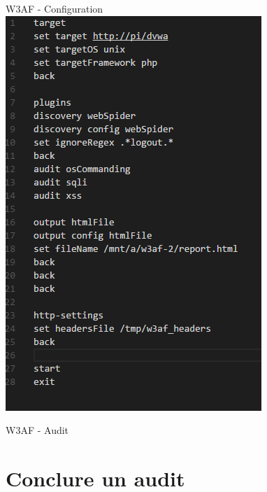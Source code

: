 \documentclass{beamer}
\begin{document}
\begin{frame}{ W3AF - Configuration}
\centering
\includegraphics[height=0.63\paperwidth ]{schemas/images/w3af_script.png}
\end{frame}

\begin{frame}{W3AF - Audit}
	\begin{center}
	\end{center} 
\end{frame}

\section{Conclure un audit}	
\end{document}

